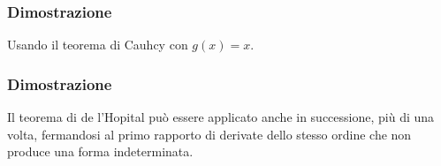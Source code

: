 \documentclass[letterpaper,10pt,english]{jupyterBook}
\begin{document}
\sphinxAtStartPar
{}
\label{\detokenize{ch/infinitesimal_calculus/derivatives:infinitesimal-calculus-derivatives-thm-lagrange}}\subsubsection*{Dimostrazione}

\sphinxAtStartPar
{} Usando il teorema di Cauhcy con \(g(x) = x\).
\label{\detokenize{ch/infinitesimal_calculus/derivatives:infinitesimal-calculus-derivatives-thm-hopital}}\subsubsection*{Dimostrazione}

\sphinxAtStartPar
{}

\sphinxAtStartPar
{} Il teorema di de l’Hopital può essere applicato anche in successione, più di una volta, fermandosi al primo rapporto di derivate dello stesso ordine che non produce una forma indeterminata.
\end{document}
